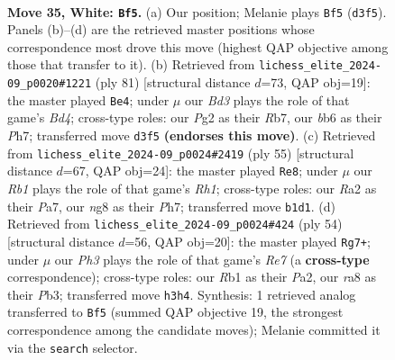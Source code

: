 \documentclass[11pt]{article}
\begin{document}
\clearpage

\begin{figure}[p]\centering
\begin{subfigure}{0.46\textwidth}\centering
\resizebox{\linewidth}{!}{%
\newchessgame
\chessboard[
  setfen={r5nr/p4k1p/1b6/2p5/5B2/PP1B3P/R1P3P1/1R4K1 w - - 1 35},
  showmover=false,
  pgfstyle=straightmove, color=movearrow, markmove={d3-f5}
]}
\caption{}
\end{subfigure}\hfill
\begin{subfigure}{0.46\textwidth}\centering
\resizebox{\linewidth}{!}{%
\newchessgame
\chessboard[
  setfen={r5k1/1r3p1p/3Bp1pP/3bP1P1/p7/8/2R3PK/6R1 b - - 4 41},
  showmover=false,
  pgfstyle=straightmove, color=movearrow, markmove={d5-e4}
]}
\caption{}
\end{subfigure}
\\[4pt]
\begin{subfigure}{0.46\textwidth}\centering
\resizebox{\linewidth}{!}{%
\newchessgame
\chessboard[
  setfen={2k4r/p1p4p/3b2p1/8/2pP4/8/PPK2R1P/5N2 b - - 0 28},
  showmover=false,
  pgfstyle=straightmove, color=movearrow, markmove={h8-e8}
]}
\caption{}
\end{subfigure}\hfill
\begin{subfigure}{0.46\textwidth}\centering
\resizebox{\linewidth}{!}{%
\newchessgame
\chessboard[
  setfen={3r2k1/R3R3/2p2rp1/5b1p/2P5/1PNn1B1P/P5P1/6K1 w - - 1 28},
  showmover=false,
  pgfstyle=straightmove, color=movearrow, markmove={e7-g7}
]}
\caption{}
\end{subfigure}
\caption{\textbf{Move 35, White: \texttt{Bf5}.} (a) Our position; Melanie plays \texttt{Bf5} (\texttt{d3f5}). Panels (b)--(d) are the retrieved master positions whose correspondence most drove this move (highest QAP objective among those that transfer to it). (b) Retrieved from \texttt{lichess\_elite\_2024-09\_p0020\#1221} (ply 81) [structural distance $d$=73, QAP obj=19]: the master played \texttt{Be4}; under $\mu$ our \emph{Bd3} plays the role of that game's \emph{Bd4}; cross-type roles: our \emph{P}g2 as their \emph{R}b7, our \emph{b}b6 as their \emph{P}h7; transferred move \texttt{d3f5} \textbf{(endorses this move)}. (c) Retrieved from \texttt{lichess\_elite\_2024-09\_p0024\#2419} (ply 55) [structural distance $d$=67, QAP obj=24]: the master played \texttt{Re8}; under $\mu$ our \emph{Rb1} plays the role of that game's \emph{Rh1}; cross-type roles: our \emph{R}a2 as their \emph{P}a7, our \emph{n}g8 as their \emph{P}h7; transferred move \texttt{b1d1}. (d) Retrieved from \texttt{lichess\_elite\_2024-09\_p0024\#424} (ply 54) [structural distance $d$=56, QAP obj=20]: the master played \texttt{Rg7+}; under $\mu$ our \emph{Ph3} plays the role of that game's \emph{Re7} (a \textbf{cross-type} correspondence); cross-type roles: our \emph{R}b1 as their \emph{P}a2, our \emph{r}a8 as their \emph{P}b3; transferred move \texttt{h3h4}. Synthesis: 1 retrieved analog transferred to \texttt{Bf5} (summed QAP objective 19, the strongest correspondence among the candidate moves); Melanie committed it via the \texttt{search} selector.}
\label{fig:thought-m68}
\end{figure}
\end{document}
